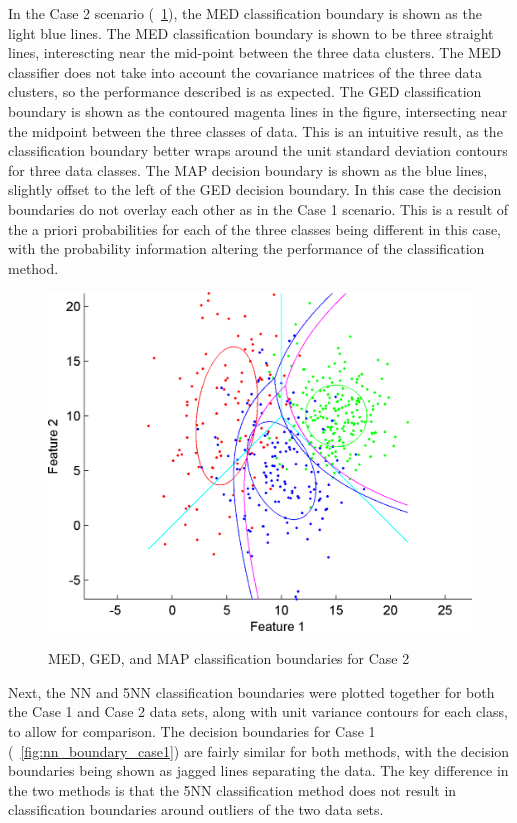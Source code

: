 \documentclass[article, 1.5space, letterpaper, 12pt, oneside, header, footer]{SydeClass}
\begin{document}
In the Case 2 scenario (~\ref{fig:med_ged_map_classifier_case2}), the MED classification boundary is shown as the light blue lines. The MED classification boundary is shown to be three straight lines, interescting near the mid-point between the three data clusters. The MED classifier does not take into account the covariance matrices of the three data clusters, so the performance described is as expected. The GED classification boundary is shown as the contoured magenta lines in the figure, intersecting near the midpoint between the three classes of data. This is an intuitive result, as the classification boundary better wraps around the unit standard deviation contours for three data classes. The MAP decision boundary is shown as the blue lines, slightly offset to the left of the GED decision boundary. In this case the decision boundaries do not overlay each other as in the Case 1 scenario. This is a result of the a priori probabilities for each of the three classes being different in this case, with the probability information altering the performance of the classification method.

\begin{figure}[ht]
\centering
	{
	\includegraphics[width=0.45\linewidth]{fig2b-AB_MED_MICD_MAP}
	}
	
	\caption{MED, GED, and MAP classification boundaries for Case 2}
	\label{fig:med_ged_map_classifier_case2}
\end{figure}

Next, the NN and 5NN classification boundaries were plotted together for both the Case 1 and Case 2 data sets, along with unit variance contours for each class, to allow for comparison. The decision boundaries for Case 1 (~\ref{fig:nn_boundary_case1}) are fairly similar for both methods, with the decision boundaries being shown as jagged lines separating the data. The key difference in the two methods is that the 5NN classification method does not result in classification boundaries around outliers of the two data sets.
\end{document}
